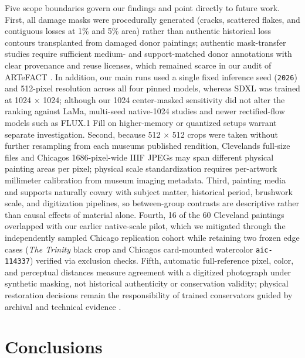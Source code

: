 \documentclass[fleqn,12pt,lineno]{wlpeerj}
\begin{document}
Five scope boundaries govern our findings and point directly to future work. First, all damage masks were procedurally generated (cracks, scattered flakes, and contiguous losses at 1\% and 5\% area) rather than authentic historical loss contours transplanted from damaged donor paintings; authentic mask-transfer studies require sufficient medium- and support-matched donor annotations with clear provenance and reuse licenses, which remained scarce in our audit of ARTeFACT \citep{ivanova2024artefact}. In addition, our main runs used a single fixed inference seed (\texttt{2026}) and 512-pixel resolution across all four pinned models, whereas SDXL was trained at 1024 \ensuremath{\times} 1024; although our 1024 center-masked sensitivity did not alter the ranking against LaMa, multi-seed native-1024 studies and newer rectified-flow models such as FLUX.1 Fill \citep{fluxfill} on higher-memory or quantized setups warrant separate investigation. Second, because 512 \ensuremath{\times} 512 crops were taken without further resampling from each museum\textquotesingle s published rendition, Cleveland\textquotesingle s full-size files and Chicago\textquotesingle s 1686-pixel-wide IIIF JPEGs may span different physical painting areas per pixel; physical scale standardization requires per-artwork millimeter calibration from museum imaging metadata. Third, painting media and supports naturally covary with subject matter, historical period, brushwork scale, and digitization pipelines, so between-group contrasts are descriptive rather than causal effects of material alone. Fourth, 16 of the 60 Cleveland paintings overlapped with our earlier native-scale pilot, which we mitigated through the independently sampled Chicago replication cohort while retaining two frozen edge cases (\emph{The Trinity} black crop and Chicago\textquotesingle s card-mounted watercolor \texttt{aic-114337}) verified via exclusion checks. Fifth, automatic full-reference pixel, color, and perceptual distances measure agreement with a digitized photograph under synthetic masking, not historical authenticity or conservation validity; physical restoration decisions remain the responsibility of trained conservators guided by archival and technical evidence \citep{aic1994, icomcc2008}.

\section{Conclusions}\label{conclusions}
\end{document}

